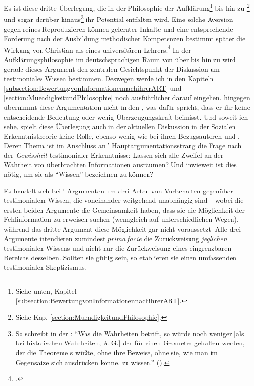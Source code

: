 \begin{nummerierung}
 Es ist diese dritte Überlegung, die in der Philosophie der
 Aufklärung\footnote{Siehe unten, Kapitel
 \ref{subsection:BewertungvonInformationennachihrerART}.} bis hin zu
 \footnote{Siehe Kap.
 \ref{section:MuendigkeitundPhilosophie}.} und sogar darüber hinaus\footnote{So
 schreibt  in der :
 \enquote{Was die  Wahrheiten betrift, so würde noch weniger
 [als bei historischen Wahrheiten; A.\,G.] der für einen Geometer gehalten
 werden, der die Theoreme s  wüßte, ohne ihre
 Beweise, ohne sie, wie man im Gegensatze sich ausdrücken könne, 
 zu wissen.} \mkbibparens{\cite[][IX: 31.35--32.1]{Hegel:GesammelteWerke}}.} ihr Potential entfalten wird.
 Eine solche Aversion gegen reines Reproduzieren-können gelernter Inhalte und eine entsprechende Forderung
 nach der Ausbildung methodischer Kompetenzen bestimmt später die Wirkung von Christian
  als eines universitären
 Lehrers.\footnote{\cite[Vgl.][241--243]{Albrecht:ChristianThomasius1999}.}
 In der Aufklärungsphilosophie im deutschsprachigen Raum von  über
  bis hin zu  wird gerade dieses Argument den zentralen
 Gesichtspunkt der Diskussion um testimoniales Wissen bestimmen. Deswegen werde
 ich in den Kapiteln \ref{subsection:BewertungvonInformationennachihrerART} und
 \ref{section:MuendigkeitundPhilosophie} noch ausführlicher darauf eingehen.
  hingegen übernimmt diese Argumentation nicht in den , was dafür spricht, dass er ihr keine entscheidende Bedeutung oder wenig Überzeugungskraft
 beimisst. Und soweit ich sehe, spielt diese Überlegung auch in der aktuellen
 Diskussion in der Sozialen Erkenntnistheorie keine Rolle, ebenso wenig wie bei
 ihren Bezugsautoren  und . Deren Thema ist im Anschluss
 an ' Hauptargumentationsstrang die Frage nach der
 \emph{Gewissheit} testimonialer Erkenntnisse: Lassen sich alle Zweifel an der Wahrheit von
 überbrachten Informationen ausräumen? Und inwieweit ist dies nötig, um sie als
 \enquote{Wissen} bezeichnen zu können?
\end{nummerierung}


Es handelt sich bei ' Argumenten um drei Arten von
Vorbehalten gegenüber testimonialem Wissen, die voneinander weitgehend
unabhängig sind -- wobei die ersten beiden Argumente die Gemeinsamkeit haben,
dass sie die Möglichkeit der Fehlinformation zu erweisen suchen (wenngleich auf
unterschiedlichen Wegen), während das dritte Argument diese Möglichkeit gar
nicht voraussetzt. Alle drei Argumente intendieren zumindest \emph{prima facie}
die Zurückweisung \emph{jeglichen} testimonialen Wissens und nicht nur die
Zurückweisung eines eingrenzbaren Bereichs desselben. Sollten sie gültig sein,
so etablieren sie einen umfassenden testimonialen Skeptizismus.

